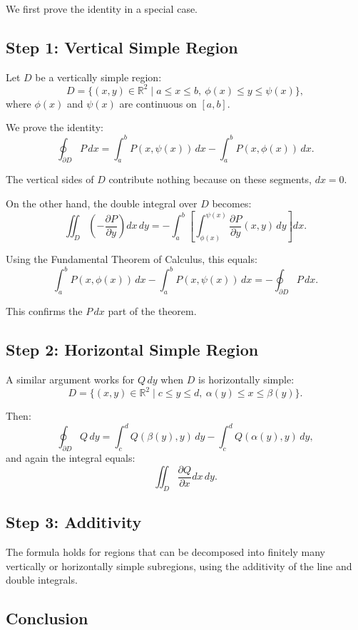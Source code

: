 \documentclass[12pt]{article}
\theoremstyle{definition} %
\theoremstyle{plain} %
\begin{document}
We first prove the identity in a special case.

\subsection*{Step 1: Vertical Simple Region}

Let $D$ be a vertically simple region:
\[
D = \{ (x, y) \in \mathbb{R}^2 \mid a \leq x \leq b, \ \phi(x) \leq y \leq \psi(x) \},
\]
where $\phi(x)$ and $\psi(x)$ are continuous on $[a, b]$.

We prove the identity:
\[
\oint_{\partial D} P\,dx = \int_a^b P(x, \psi(x))\,dx - \int_a^b P(x, \phi(x))\,dx.
\]

The vertical sides of $D$ contribute nothing because on these segments, $dx = 0$.

On the other hand, the double integral over $D$ becomes:
\[
\iint_D \left( -\frac{\partial P}{\partial y} \right) dx\,dy = - \int_a^b \left[ \int_{\phi(x)}^{\psi(x)} \frac{\partial P}{\partial y}(x,y)\,dy \right] dx.
\]

Using the Fundamental Theorem of Calculus, this equals:
\[
\int_a^b P(x, \phi(x))\,dx - \int_a^b P(x, \psi(x))\,dx = - \oint_{\partial D} P\,dx.
\]

This confirms the $P\,dx$ part of the theorem.

\subsection*{Step 2: Horizontal Simple Region}

A similar argument works for $Q\,dy$ when $D$ is horizontally simple:
\[
D = \{ (x, y) \in \mathbb{R}^2 \mid c \leq y \leq d, \ \alpha(y) \leq x \leq \beta(y) \}.
\]

Then:
\[
\oint_{\partial D} Q\,dy = \int_c^d Q(\beta(y), y)\,dy - \int_c^d Q(\alpha(y), y)\,dy,
\]
and again the integral equals:
\[
\iint_D \frac{\partial Q}{\partial x} dx\,dy.
\]

\subsection*{Step 3: Additivity}

The formula holds for regions that can be decomposed into finitely many vertically or horizontally simple subregions, using the additivity of the line and double integrals.

\subsection*{Conclusion}
\end{document}
